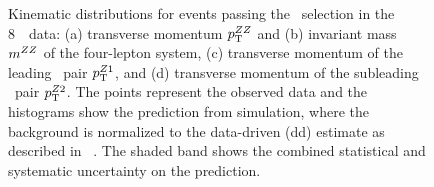 \begin{figure}[htbp]
    \begin{center}
    \caption[Kinematic distributions for events passing the \ZZ\ selection in
    the 8~\tev\ data.]
    {Kinematic distributions for events passing the \ZZ\ selection in
    the 8~\tev\ data: (a) transverse momentum $p_{\mathrm{T}}^{ZZ}$ and (b) invariant mass $m^{ZZ}$ of the 
    four-lepton system, (c) transverse momentum of the leading
    \dilep\ pair $p_{\mathrm{T}}^{Z1}$, and (d) transverse momentum of the subleading
    \dilep\ pair $p_{\mathrm{T}}^{Z2}$. The points represent the observed data and the 
    histograms show the prediction from simulation, where the background
    is normalized to the data-driven (dd) estimate as described in
    ~. The shaded band 
    shows the combined statistical and systematic uncertainty on the prediction. 
    }
    \label{fig:zzdists-ZZ-eight}
    \end{center}
\end{figure}

